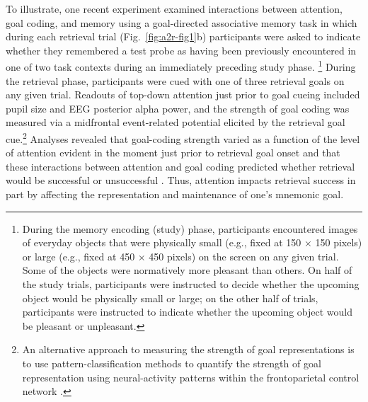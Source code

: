 To illustrate, one recent experiment examined interactions between attention, goal coding, and memory using a goal-directed associative memory task in which during each retrieval trial (Fig.~\ref{fig:a2r-fig1}b) participants were asked to indicate whether they remembered a test probe as having been previously encountered in one of two task contexts during an immediately preceding study phase. \footnote{During the memory encoding (study) phase, participants encountered images of everyday objects that were physically small (e.g., fixed at 150 × 150 pixels) or large (e.g., fixed at 450 × 450 pixels) on the screen on any given trial. Some of the objects were normatively more pleasant than others. On half of the study trials, participants were instructed to decide whether the upcoming object would be physically small or large; on the other half of trials, participants were instructed to indicate whether the upcoming object would be pleasant or unpleasant.} During the retrieval phase, participants were cued with one of three retrieval goals on any given trial. Readouts of top-down attention just prior to goal cueing included pupil size and EEG posterior alpha power, and the strength of goal coding was measured via a midfrontal event-related potential elicited by the retrieval goal cue.\footnote{An alternative approach to measuring the strength of goal representations is to use pattern-classification methods to quantify the strength of goal representation using neural-activity patterns within the frontoparietal control network \parencite[e.g.,][]{waskom2014frontoparietal}.} Analyses revealed that goal-coding strength varied as a function of the level of attention evident in the moment just prior to retrieval goal onset and that these interactions between attention and goal coding predicted whether retrieval would be successful or unsuccessful \parencite[Fig.~\ref{fig:a2r-fig1}c;][]{madore2022readiness,madore2020memory}. Thus, attention impacts retrieval success in part by affecting the representation and maintenance of one’s mnemonic goal.

